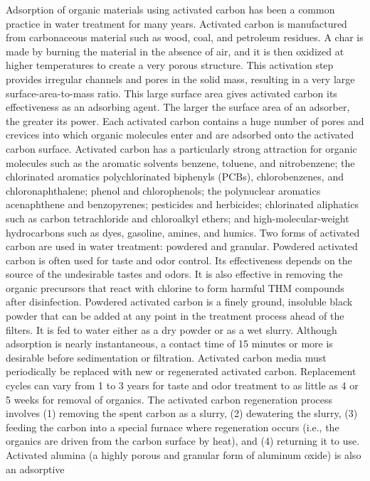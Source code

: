 \documentclass{article}
\begin{document}
Adsorption of organic materials using activated carbon has been a common
practice in water treatment for many years. Activated carbon is
manufactured from carbonaceous material such as wood, coal, and
petroleum residues. A char is made by burning the material in the
absence of air, and it is then oxidized at higher temperatures to create
a very porous structure. This activation step provides irregular
channels and pores in the solid mass, resulting in a very large
surface-area-to-mass ratio. This large surface area gives activated
carbon its effectiveness as an adsorbing agent. The larger the surface
area of an adsorber, the greater its power. Each activated carbon
contains a huge number of pores and crevices into which organic
molecules enter and are adsorbed onto the activated carbon surface.
Activated carbon has a particularly strong attraction for organic
molecules such as the aromatic solvents benzene, toluene, and
nitrobenzene; the chlorinated aromatics polychlorinated biphenyls
(PCBs), chlorobenzenes, and chloronaphthalene; phenol and chlorophenols;
the polynuclear aromatics acenaphthene and benzopyrenes; pesticides and
herbicides; chlorinated aliphatics such as carbon tetrachloride and
chloroalkyl ethers; and high-molecular-weight hydrocarbons such as dyes,
gasoline, amines, and humics. Two forms of activated carbon are used in
water treatment: powdered and granular. Powdered activated carbon is
often used for taste and odor control. Its effectiveness depends on the
source of the undesirable tastes and odors. It is also effective in
removing the organic precursors that react with chlorine to form harmful
THM compounds after disinfection. Powdered activated carbon is a finely
ground, insoluble black powder that can be added at any point in the
treatment process ahead of the filters. It is fed to water either as a
dry powder or as a wet slurry. Although adsorption is nearly
instantaneous, a contact time of 15 minutes or more is desirable before
sedimentation or filtration. Activated carbon media must periodically be
replaced with new or regenerated activated carbon. Replacement cycles
can vary from 1 to 3 years for taste and odor treatment to as little as
4 or 5 weeks for removal of organics. The activated carbon regeneration
process involves (1) removing the spent carbon as a slurry, (2)
dewatering the slurry, (3) feeding the carbon into a special furnace
where regeneration occurs (i.e., the organics are driven from the carbon
surface by heat), and (4) returning it to use. Activated alumina (a
highly porous and granular form of aluminum oxide) is also an adsorptive
\end{document}
